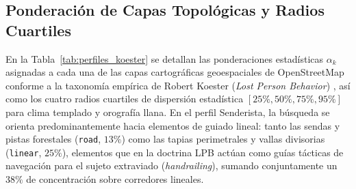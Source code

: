 \subsection{Ponderación de Capas Topológicas y Radios Cuartiles}

En la Tabla~\ref{tab:perfiles_koester} se detallan las ponderaciones estadísticas $\alpha_k$ asignadas a cada una de las capas cartográficas geoespaciales de OpenStreetMap conforme a la taxonomía empírica de Robert Koester (\textit{Lost Person Behavior}) \cite{koester2008lost}, así como los cuatro radios cuartiles de dispersión estadística $[25\%, 50\%, 75\%, 95\%]$ para clima templado y orografía llana. En el perfil Senderista, la búsqueda se orienta predominantemente hacia elementos de guiado lineal: tanto las sendas y pistas forestales (\texttt{road}, $13\%$) como las tapias perimetrales y vallas divisorias (\texttt{linear}, $25\%$), elementos que en la doctrina LPB actúan como guías tácticas de navegación para el sujeto extraviado (\textit{handrailing}), sumando conjuntamente un $38\%$ de concentración sobre corredores lineales.

